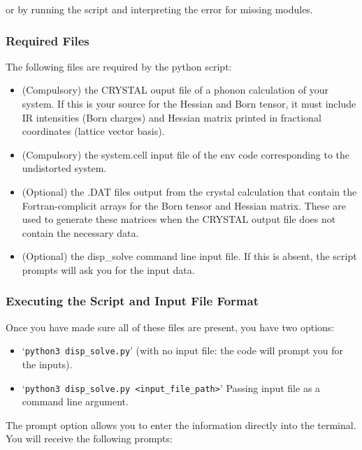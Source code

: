 or by running the script and interpreting the error for missing modules.

\subsubsection{Required Files}
The following files are required by the python script:
\begin{itemize}
  \item (Compulsory) the CRYSTAL ouput file of a phonon calculation of your system. If this is your source for the Hessian and Born tensor, it must include IR intensities (Born charges) and Hessian matrix printed in fractional coordinates (lattice vector basis).
  \item (Compulsory) the system.cell input file of the env code corresponding to the undistorted system.
  \item (Optional) the .DAT files output from the crystal calculation that contain the Fortran-complicit arrays for the Born tensor and Hessian matrix. These are used to generate these matrices when the CRYSTAL output file does not contain the necessary data.
  \item (Optional) the disp\_solve command line input file. If this is absent, the script prompts will ask you for the input data.  
\end{itemize}

\subsubsection{Executing the Script and Input File Format}
Once you have made sure all of these files are present, you have two options: 
\begin{itemize}
	\item `\texttt{python3 disp\_solve.py}' (with no input file: the code will prompt you for the inputs).
	\item `\texttt{python3 disp\_solve.py <input\_file\_path>}' Passing input file as a command line argument.
\end{itemize}

The prompt option allows you to enter the information directly into the terminal. You will receive the following prompts:

